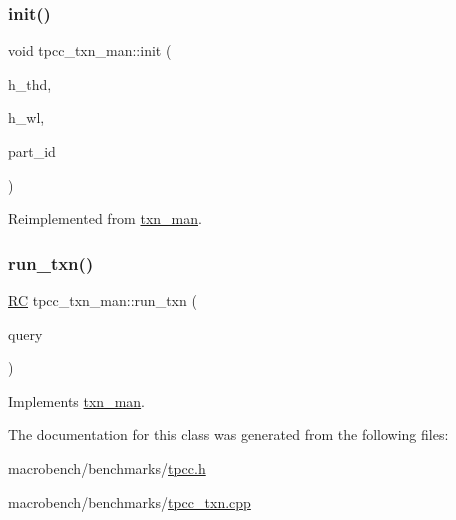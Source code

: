 \subsubsection{\texorpdfstring{init()}{init()}}
{\footnotesize\ttfamily void tpcc\+\_\+txn\+\_\+man\+::init (\begin{DoxyParamCaption}\item[{\hyperlink{classthread__t}{thread\+\_\+t} $\ast$}]{h\+\_\+thd,  }\item[{\hyperlink{classworkload}{workload} $\ast$}]{h\+\_\+wl,  }\item[{uint64\+\_\+t}]{part\+\_\+id }\end{DoxyParamCaption})\hspace{0.3cm}{\ttfamily [virtual]}}



Reimplemented from \hyperlink{classtxn__man_a778925bb3edd6a54a27161f67792edec}{txn\+\_\+man}.

\mbox{\label{classtpcc__txn__man_a19f99ffaf91e1f977fe517d617493a8a}} 
\subsubsection{\texorpdfstring{run\+\_\+txn()}{run\_txn()}}
{\footnotesize\ttfamily \hyperlink{global_8h_a78c49a674c810fdd03d20432f7be864a}{RC} tpcc\+\_\+txn\+\_\+man\+::run\+\_\+txn (\begin{DoxyParamCaption}\item[{\hyperlink{classbase__query}{base\+\_\+query} $\ast$}]{query }\end{DoxyParamCaption})\hspace{0.3cm}{\ttfamily [virtual]}}



Implements \hyperlink{classtxn__man_a71142ded36a4be5629ea75d486a105ae}{txn\+\_\+man}.



The documentation for this class was generated from the following files\+:\begin{DoxyCompactItemize}
\item 
macrobench/benchmarks/\hyperlink{tpcc_8h}{tpcc.\+h}\item 
macrobench/benchmarks/\hyperlink{tpcc__txn_8cpp}{tpcc\+\_\+txn.\+cpp}\end{DoxyCompactItemize}

